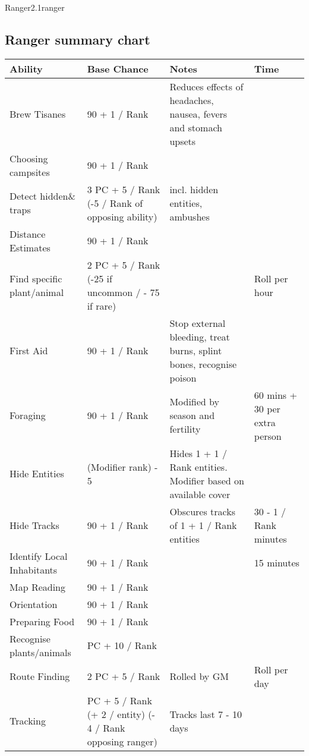 \begin{skill}{Ranger}{2.1}{ranger}
\begin{table*}
\subsection{Ranger summary chart}
\begin{tabularx}{\linewidth}{|l|p{100pt}|X|l|} \hline
\textbf{Ability}		& \textbf{Base Chance}	& \textbf{Notes}				& \textbf{Time} \\ \hline
Brew Tisanes			& 90 + 1 / Rank	& Reduces effects of headaches, nausea, fevers and stomach upsets & \\ \hline
Choosing campsites		& 90 + 1 / Rank	& & \\ \hline
Detect hidden\& traps		& 3 \x PC + 5 / Rank (-5 / Rank of opposing ability) 	& incl. hidden entities, ambushes & \\ \hline
Distance Estimates		& 90 + 1 / Rank		& & \\ \hline
Find specific plant/animal	& 2 \x PC + 5 / Rank (-25 if uncommon / - 75 if rare) 	&	& Roll per hour \\ \hline
First Aid			& 90 + 1 / Rank		& Stop external bleeding, treat burns, splint bones, recognise poison	&\\ \hline
Foraging			& 90 + 1 / Rank		& Modified by season and fertility	& 60 mins + 30 per extra person\\ \hline
Hide Entities			& (Modifier \x rank) - 5& Hides 1 + 1 / Rank entities. Modifier based on available cover & \\ \hline
Hide Tracks			& 90 + 1 / Rank		& Obscures tracks of 1 + 1 / Rank entities	& 30 - 1 / Rank minutes\\ \hline
Identify Local Inhabitants	& 90 + 1 / Rank		& & 15 minutes \\ \hline
Map Reading			& 90 + 1 / Rank		& & \\ \hline
Orientation			& 90 + 1 / Rank		& & \\ \hline
Preparing Food			& 90 + 1 / Rank		& & \\ \hline
Recognise plants/animals	& PC + 10 / Rank	& & \\ \hline
Route Finding			& 2 \x PC + 5 / Rank	& Rolled by GM			& Roll per day \\ \hline
Tracking			& PC + 5 / Rank (+ 2 / entity) (- 4 / Rank opposing ranger)	& Tracks last 7 - 10 days & \\ \hline
\end{tabularx}
\end{table*}
\end{skill}
